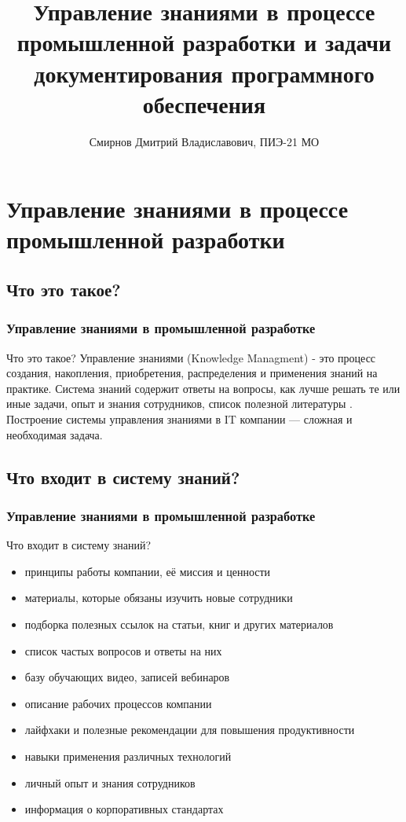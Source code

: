 \documentclass{../industrial-development}
\title{Управление знаниями в процессе промышленной разработки и задачи документирования программного обеспечения}
\author{Смирнов Дмитрий Владиславович, ПИЭ-21 МО}
\date{}
\begin{document}
\begin{frame}
  \titlepage
\end{frame}


\section{Управление знаниями в процессе промышленной разработки}

\subsection{Что это такое?}

\begin{frame} \frametitle{Управление знаниями в промышленной разработке}
  \begin{block}{Что это такое?}
  Управление знаниями (Knowledge Managment) - это процесс создания, накопления, приобретения, распределения и применения знаний на практике. Система знаний содержит ответы на вопросы,  как лучше решать те или иные задачи, опыт и знания сотрудников, список полезной литературы . Построение системы управления знаниями в IT компании — сложная и необходимая задача.
  \end{block}
\end{frame}

\subsection{Что входит в систему знаний?}

\begin{frame} \frametitle{Управление знаниями в промышленной разработке}
  \begin{block}{Что входит в систему знаний?}
  \end{block}
  
  \begin{itemize}
  \item принципы работы компании, её миссия и ценности
  \item материалы, которые обязаны изучить новые сотрудники
  \item подборка полезных ссылок на статьи, книг и других материалов
  \item список частых вопросов и ответы на них
  \item базу обучающих видео, записей вебинаров
  \item описание рабочих процессов компании
  \item лайфхаки и полезные рекомендации для повышения продуктивности
  \item навыки применения различных технологий
  \item личный опыт и знания сотрудников
  \item информация о корпоративных стандартах
  \end{itemize}
\end{frame}
\end{document}
